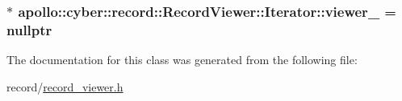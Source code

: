 \hypertarget{classapollo_1_1cyber_1_1record_1_1RecordViewer_1_1Iterator_a3ff81d30a9a632768e017ca86ab3d703}{
\subsubsection[{viewer\-\_\-}]{$\ast$ apollo\-::cyber\-::record\-::\-Record\-Viewer\-::\-Iterator\-::viewer\-\_\- = nullptr\hspace{0.3cm}{\ttfamily [private]}}}\label{classapollo_1_1cyber_1_1record_1_1RecordViewer_1_1Iterator_a3ff81d30a9a632768e017ca86ab3d703}


The documentation for this class was generated from the following file\-:\begin{DoxyCompactItemize}
\item 
record/\hyperlink{record__viewer_8h}{record\-\_\-viewer.\-h}\end{DoxyCompactItemize}
